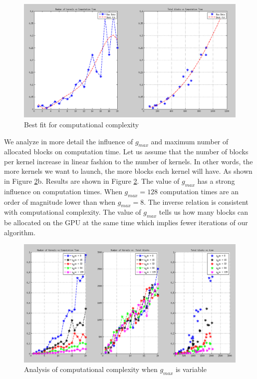 \documentclass[
  12pt,
  a4paperpaper,
]{report}
\begin{document}
\begin{figure}
\centering
\includegraphics[width=1\textwidth,height=\textheight]{source/figures/max100min2gmax10.png}
\caption{Best fit for computational complexity \label{img:bestfit}}
\end{figure}

We analyze in more detail the influence of \(g_{max}\) and maximum
number of allocated blocks on computation time. Let us assume that
the number of blocks per kernel increase in linear fashion to the number of
kernels. In other words, the more kernels we want to launch, the more
blocks each kernel will have. As shown in Figure
\ref{img:gmax_variable}b. Results are shown in Figure
\ref{img:gmax_variable}. The value of \(g_{max}\) has a strong influence
on computation times. When \(g_{max} = 128\) computation times are an
order of magnitude lower than when \(g_{max} = 8\). The inverse relation
is consistent with computational complexity. The value of \(g_{max}\)
tells us how many blocks can be allocated on the GPU at the same time
which implies fewer iterations of our algorithm.

\begin{figure}
\centering
\includegraphics[width=1\textwidth,height=\textheight]{source/figures/gmax_variable.png}
\caption{Analysis of computational complexity when \(g_{max}\) is
variable \label{img:gmax_variable}}
\end{figure}
\end{document}
